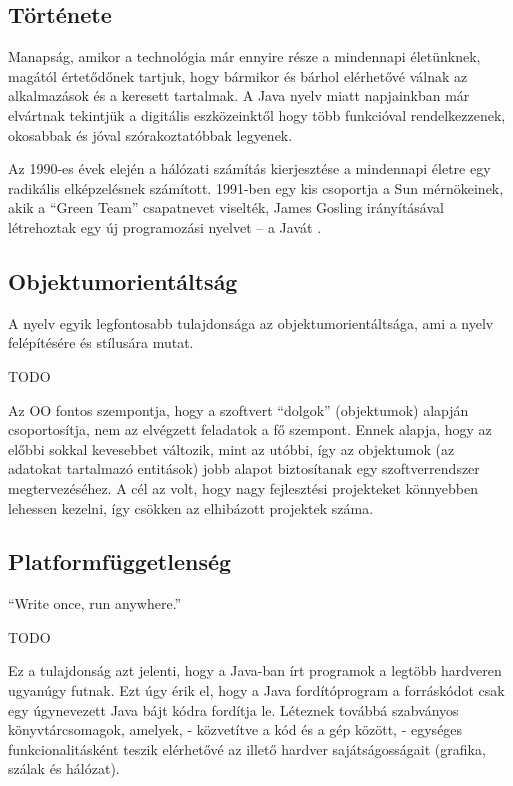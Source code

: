 \documentclass[a4paper,12pt]{report}
\begin{document}



\subsection{Története}
\label{javahistory}

Manapság, amikor a technológia már ennyire része a mindennapi életünknek, magától értetődőnek tartjuk, hogy bármikor és bárhol elérhetővé válnak az alkalmazások és a keresett tartalmak. A Java nyelv miatt napjainkban már elvártnak tekintjük a digitális eszközeinktől hogy több funkcióval rendelkezzenek, okosabbak és jóval szórakoztatóbbak legyenek.

\vspace{2mm}
Az 1990-es évek elején a hálózati számítás kierjesztése a mindennapi életre egy radikális elképzelésnek számított. 1991-ben egy kis csoportja a Sun mérnökeinek, akik a ``Green Team'' csapatnevet viselték, James Gosling irányításával létrehoztak egy új programozási nyelvet -- a Javát \cite{javahistory}.

\subsection{Objektumorientáltság}
\label{oo}

A nyelv egyik legfontosabb tulajdonsága az objektumorientáltsága, ami a nyelv felépítésére és stílusára mutat. 

TODO

Az OO fontos szempontja, hogy a szoftvert ``dolgok'' (objektumok) alapján csoportosítja, nem az elvégzett feladatok a fő szempont. Ennek alapja, hogy az előbbi sokkal kevesebbet változik, mint az utóbbi, így az objektumok (az adatokat tartalmazó entitások) jobb alapot biztosítanak egy szoftverrendszer megtervezéséhez. A cél az volt, hogy nagy fejlesztési projekteket könnyebben lehessen kezelni, így csökken az elhibázott projektek száma.

\subsection{Platformfüggetlenség}
\label{platformfugg}

``Write once, run anywhere.''


TODO

\vspace{2mm}
Ez a tulajdonság azt jelenti, hogy a Java-ban írt programok a legtöbb hardveren ugyanúgy futnak. Ezt úgy érik el, hogy a Java fordítóprogram a forráskódot csak egy úgynevezett Java bájt kódra fordítja le. Léteznek továbbá szabványos könyvtárcsomagok, amelyek, - közvetítve a kód és a gép között, - egységes funkcionalitásként teszik elérhetővé az illető hardver sajátságosságait (grafika, szálak és hálózat).
\end{document}
